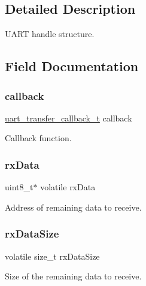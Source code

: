 \subsection{Detailed Description}
U\+A\+RT handle structure. 

\subsection{Field Documentation}
\mbox{\label{struct__uart__handle_aa499a13beb1e3ebd00438325f5107a65}} 
\subsubsection{\texorpdfstring{callback}{callback}}
{\footnotesize\ttfamily \mbox{\hyperlink{group__uart__driver_ga2868b6ea396ab212547f2157380429c5}{uart\+\_\+transfer\+\_\+callback\+\_\+t}} callback}

Callback function. \mbox{\label{struct__uart__handle_aa58335de5bfa8923228432b62ea9308a}} 
\subsubsection{\texorpdfstring{rxData}{rxData}}
{\footnotesize\ttfamily uint8\+\_\+t$\ast$ volatile rx\+Data}

Address of remaining data to receive. \mbox{\label{struct__uart__handle_ae1b7c6ae1b7e7ead628afe5410fa3f31}} 
\subsubsection{\texorpdfstring{rxDataSize}{rxDataSize}}
{\footnotesize\ttfamily volatile size\+\_\+t rx\+Data\+Size}

Size of the remaining data to receive. \mbox{\label{struct__uart__handle_a180fd12c1a88bb61ac4b817f4e4e6bcd}} 
